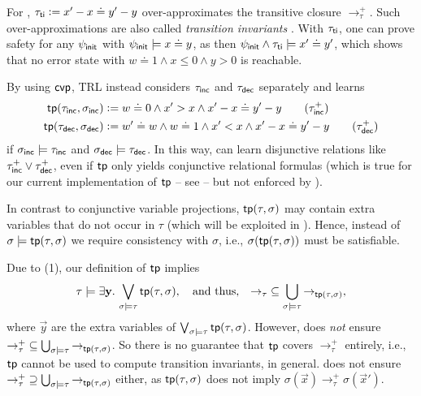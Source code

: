 \begin{example}
  \label{ex:Transition Invariants}
  For , $\tau_{\mathsf{ti}} \mathrel{\mathop:}= x' - x \doteq y' - y$ over-approximates the transitive
  closure $\to^+_\tau$.
  Such over-approximations are also called \emph{transition invariants} \cite{transition_invariants}.
  With $\tau_{\mathsf{ti}}$, one can prove safety for any $\psi_{\mathsf{init}}$ with $\psi_{\mathsf{init}} \models x \doteq y$, as then $\psi_{\mathsf{init}} \land \tau_{\mathsf{ti}} \models x' \doteq y'$, which shows that no error state with $w \doteq 1 \land x \leq 0 \land y > 0$ is reachable.

  By using $\mathsf{cvp}$, TRL instead considers $\tau_{\mathsf{inc}}$ and $\tau_{\mathsf{dec}}$ separately and learns
  \begin{align*}
    \tip(\tau_\inc,\sigma_\inc) & {} \Def w \doteq 0 \land x' > x \land x' - x \doteq y' - y                   \tag{$\tau^+_{\inc}$} \\
    \tip(\tau_\dec,\sigma_\dec) & {} \Def w' \doteq w \land w \doteq 1 \land x' < x \land x' - x \doteq y' - y \tag{$\tau^+_{\dec}$}
  \end{align*}
  if $\sigma_{\mathsf{inc}} \models \tau_{\mathsf{inc}}$ and $\sigma_{\mathsf{dec}} \models \tau_{\mathsf{dec}}$.
  In this way,  can learn disjunctive relations like $\tau^+_{\mathsf{inc}} \lor \tau^+_{\mathsf{dec}}$, even if $\mathsf{tp}$ only yields conjunctive relational formulas (which is true for our current implementation of $\mathsf{tp}$ -- see  -- but not enforced by ).
\end{example}
%
In contrast to conjunctive variable projections, $\mathsf{tp}(\tau,\sigma)$ may contain extra variables that do not occur in $\tau$ (which will be exploited in ).
%
Hence, instead of $\sigma \models \mathsf{tp}(\tau,\sigma)$ we require consistency with $\sigma$, i.e., $\sigma(\mathsf{tp}(\tau,\sigma))$ must be satisfiable.

\begin{remark}
  \label{remark:properties-tip}
 Due to  (1), our definition of $\mathsf{tp}$ implies
 \[
  \paper{\textstyle}
  \tau \models \exists \vec{y}. \, \bigvee_{\sigma \models \tau} \tip(\tau,\sigma), \quad \text{and thus,}
  \quad
  {\to_{\tau}} \subseteq \bigcup_{\sigma \models \tau}
  {\to_{\tip(\tau,\sigma)}},
\]
where $\vec{y}$ are the extra variables of $\bigvee_{\sigma \models \tau} \mathsf{tp}(\tau,\sigma)$.
%
However,  does \emph{not} ensure
${\to^+_\tau} \subseteq \bigcup_{\sigma \models \tau}
  {\to_{\mathsf{tp}(\tau,\sigma)}}$.
  So there is no guarantee that $\mathsf{tp}$ covers $\to^+_\tau$ entirely, i.e., $\mathsf{tp}$ cannot be used to compute transition invariants, in general.
   does not ensure ${\to^+_\tau} \supseteq \bigcup_{\sigma \models \tau}
  {\to_{\mathsf{tp}(\tau,\sigma)}}$ either, as $\mathsf{tp}(\tau,\sigma)$ does not imply $\sigma(\vec{x}) \to^+_\tau \sigma(\vec{x}')$.
\end{remark}

